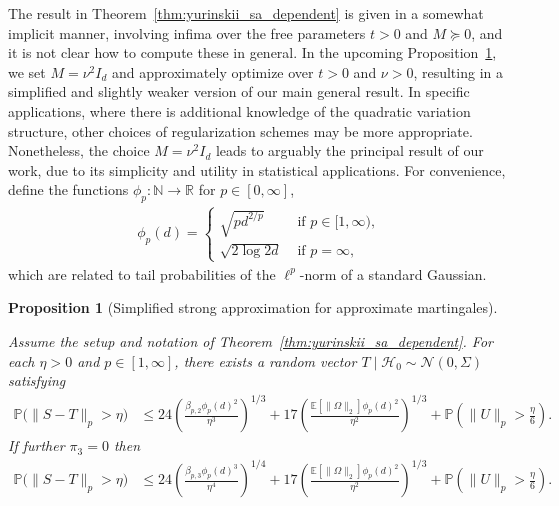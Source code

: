 \documentclass[11pt,lof]{puthesis}
\renewcommand{\P}{\ensuremath{\mathbb{P}}}
\newcommand{\N}{\ensuremath{\mathbb{N}}}
\newcommand{\R}{\ensuremath{\mathbb{R}}}
\newcommand{\E}{\ensuremath{\mathbb{E}}}
\newcommand{\cH}{\ensuremath{\mathcal{H}}}
\newcommand{\cN}{\ensuremath{\mathcal{N}}}
\theoremstyle{break}
\newtheorem{proposition}{Proposition}[section]
\theoremstyle{proof}
\begin{document}
The result in Theorem~\ref{thm:yurinskii_sa_dependent} is given in a somewhat
implicit
manner, involving infima over the free parameters $t > 0$ and $M \succeq 0$,
and it is not clear how to compute these in general. In the upcoming
Proposition~\ref{pro:yurinskii_sa_simplified}, we set $M = \nu^2 I_d$ and
approximately
optimize over $t > 0$ and $\nu > 0$, resulting in a simplified and slightly
weaker version of our main general result. In specific applications, where
there is additional knowledge of the quadratic variation structure, other
choices of regularization schemes may be more appropriate. Nonetheless, the
choice $M = \nu^2 I_d$ leads to arguably the principal result of our work,
due to its simplicity and utility in statistical applications. For convenience,
define the functions $\phi_p : \N \to \R$ for $p \in [0, \infty]$,
%
\begin{align*}
  \phi_p(d) =
  \begin{cases}
    \sqrt{pd^{2/p} } & \text{ if } p \in [1,\infty), \\
    \sqrt{2\log 2d} & \text{ if } p =\infty,
  \end{cases}
\end{align*}
%
which are related to tail probabilities
of the $\ell^p$-norm of a standard Gaussian.

\begin{proposition}[Simplified strong approximation
  for approximate martingales]%
  \label{pro:yurinskii_sa_simplified}

  Assume the setup and notation of Theorem~\ref{thm:yurinskii_sa_dependent}.
  For each $\eta > 0$ and $p \in [1,\infty]$,
  there exists a random vector $T \mid \cH_0 \sim \cN(0, \Sigma)$ satisfying
  \begin{align*}
    \P\big(\|S-T\|_p > \eta\big)
    &\leq
    24 \left(
      \frac{\beta_{p,2} \phi_p(d)^2}{\eta^3}
    \right)^{1/3}
    + 17 \left(
      \frac{\E \left[ \|\Omega\|_2 \right] \phi_p(d)^2}{\eta^2}
    \right)^{1/3}
    +\P\left(\|U\|_p>\frac{\eta}{6}\right).
  \end{align*}
  If further $\pi_3 = 0$ then
  \begin{align*}
    \P\big(\|S-T\|_p > \eta\big)
    &\leq
    24 \left(
      \frac{\beta_{p,3} \phi_p(d)^3}{\eta^4}
    \right)^{1/4}
    + 17 \left(
      \frac{\E \left[ \|\Omega\|_2 \right] \phi_p(d)^2}{\eta^2}
    \right)^{1/3}
    +\P\left(\|U\|_p>\frac{\eta}{6}\right).
  \end{align*}
\end{proposition}
\end{document}
